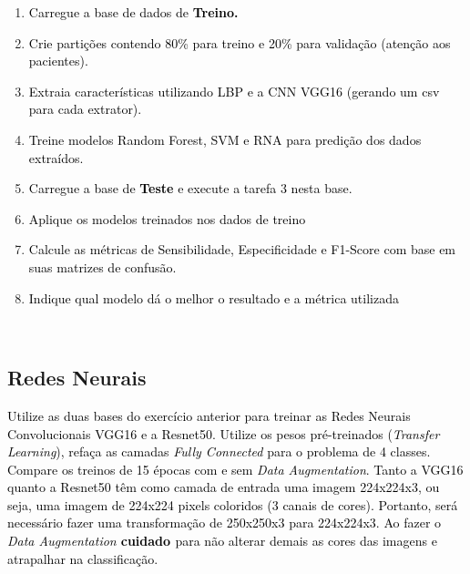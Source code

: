 \begin{enumerate}[series=listWWNumxxiv,label=\alph*),ref=\alph*]
\item \textcolor{black}{Carregue a base de dados de }\textbf{\textcolor{black}{Treino.}}\textcolor{black}{ }
\item \textcolor{black}{Crie partições contendo 80\% para treino e 20\% para validação (atenção aos
pacientes).}\textcolor{black}{ }
\item \textcolor{black}{Extraia características utilizando LBP e a CNN VGG16 (gerando um csv para cada
extrator).}\textcolor{black}{ }
\item \textcolor{black}{Treine modelos Random Forest, SVM e RNA para predição dos dados extraídos.}\textcolor{black}{ }
\item \textcolor{black}{Carregue a base de }\textbf{\textcolor{black}{Teste}}\textcolor{black}{ e execute a tarefa 3
nesta base.}\textcolor{black}{ }
\item \textcolor{black}{Aplique os modelos treinados nos dados de treino}\textcolor{black}{ }
\item \textcolor{black}{Calcule as métricas de Sensibilidade, Especificidade e F1-Score com base em suas matrizes de
confusão.}\textcolor{black}{ }
\item \textcolor{black}{Indique qual modelo dá o melhor o resultado e a métrica utilizada}\textcolor{black}{ }
\end{enumerate}
\textcolor{black}{ }

\subsection{Redes Neurais}

\textcolor{black}{Utilize as duas bases do exercício anterior para treinar as Redes Neurais Convolucionais VGG16 e a
Resnet50. Utilize os pesos pré-treinados (}\textit{\textcolor{black}{Transfer Learning}}\textcolor{black}{), refaça as
camadas }\textit{\textcolor{black}{Fully Connected}}\textcolor{black}{ para o problema de 4 classes. Compare os treinos
de 15 épocas com e sem }\textit{\textcolor{black}{Data Augmentation}}\textcolor{black}{. Tanto a VGG16 quanto a
Resnet50 têm como camada de entrada uma imagem 224x224x3, ou seja, uma imagem de 224x224 pixels coloridos (3 canais de
cores). Portanto, será necessário fazer uma transformação de 250x250x3 para 224x224x3. Ao fazer o
}\textit{\textcolor{black}{Data Augmentation }}\textbf{\textit{\textcolor{black}{
}}}\textbf{\textcolor{black}{ cuidado }}\textcolor{black}{ para não alterar demais as cores das imagens e atrapalhar na
classificação.}\textcolor{black}{ }

